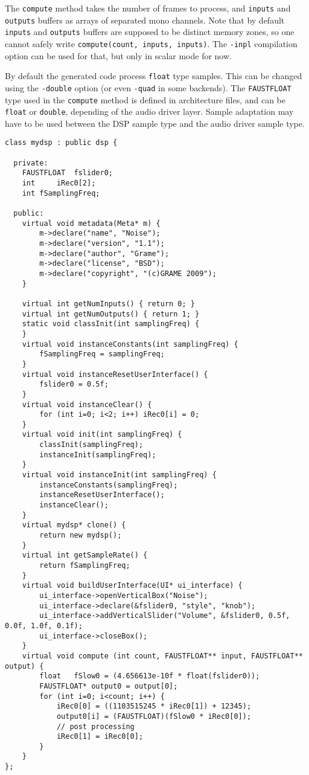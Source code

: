 The \lstinline'compute' method takes the number of frames to process, and \lstinline'inputs' and \lstinline'outputs' buffers as arrays of separated mono channels. Note that by default \lstinline'inputs' and \lstinline'outputs' buffers are supposed to be distinct memory zones, so one cannot safely write \lstinline'compute(count, inputs, inputs)'. The \lstinline'-inpl' compilation option can be used for that, but only in scalar mode for now. 

By default the generated code process \lstinline'float' type samples. This can be changed using the \lstinline'-double' option (or even \lstinline'-quad' in some backends). The \lstinline'FAUSTFLOAT' type used in the \lstinline'compute' method is defined in architecture files, and can be \lstinline'float' or \lstinline'double', depending of the audio driver layer. Sample adaptation may have to be used between the DSP sample type and the audio driver sample type.

\begin{lstlisting}[basicstyle=\ttfamily\footnotesize\color{yotxt}]
class mydsp : public dsp {

  private:
	FAUSTFLOAT 	fslider0;
	int 	iRec0[2];
	int fSamplingFreq;

  public:
	virtual void metadata(Meta* m) { 
		m->declare("name", "Noise");
		m->declare("version", "1.1");
		m->declare("author", "Grame");
		m->declare("license", "BSD");
		m->declare("copyright", "(c)GRAME 2009");
	}

	virtual int getNumInputs() { return 0; }
	virtual int getNumOutputs() { return 1; }
	static void classInit(int samplingFreq) {
	}
	virtual void instanceConstants(int samplingFreq) {
		fSamplingFreq = samplingFreq;
	}
	virtual void instanceResetUserInterface() {
		fslider0 = 0.5f;
	}
	virtual void instanceClear() {
		for (int i=0; i<2; i++) iRec0[i] = 0;
	}
	virtual void init(int samplingFreq) {
		classInit(samplingFreq);
		instanceInit(samplingFreq);
	}
	virtual void instanceInit(int samplingFreq) {
		instanceConstants(samplingFreq);
		instanceResetUserInterface();
		instanceClear();
	}
	virtual mydsp* clone() {
		return new mydsp();
	}
	virtual int getSampleRate() {
		return fSamplingFreq;
	}
	virtual void buildUserInterface(UI* ui_interface) {
		ui_interface->openVerticalBox("Noise");
		ui_interface->declare(&fslider0, "style", "knob");
		ui_interface->addVerticalSlider("Volume", &fslider0, 0.5f, 0.0f, 1.0f, 0.1f);
		ui_interface->closeBox();
	}
	virtual void compute (int count, FAUSTFLOAT** input, FAUSTFLOAT** output) {
		float 	fSlow0 = (4.656613e-10f * float(fslider0));
		FAUSTFLOAT* output0 = output[0];
		for (int i=0; i<count; i++) {
			iRec0[0] = ((1103515245 * iRec0[1]) + 12345);
			output0[i] = (FAUSTFLOAT)(fSlow0 * iRec0[0]);
			// post processing
			iRec0[1] = iRec0[0];
		}
	}
};
\end{lstlisting} 

